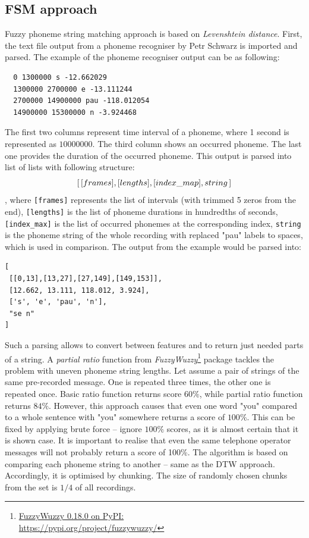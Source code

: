 \documentclass{ExcelAtFIT}
\begin{document}
\subsection{FSM approach}
Fuzzy phoneme string matching approach is based on \textit{Levenshtein distance}.
First, the text file output from a phoneme recogniser by Petr Schwarz \cite{SchwarzPhonerec} is imported and parsed. The example of the phoneme recogniser output can be as following: 
\begin{verbatim}
  0 1300000 s -12.662029
  1300000 2700000 e -13.111244
  2700000 14900000 pau -118.012054
  14900000 15300000 n -3.924468
\end{verbatim}
The first two columns represent time interval of a phoneme, where 1 second is represented as $10000000$. The third column shows an occurred phoneme. The last one provides the duration of the occurred phoneme. This output is parsed into list of lists with following structure: \texttt{\[[\,[frames],\-[lengths],\-[index\_map],\-string\,]\]}, where \texttt{[frames]} represents the list of intervals (with trimmed 5 zeros from the end), \texttt{[lengths]} is the list of phoneme durations in hundredths of seconds, \texttt{[index\_max]} is the list of occurred phonemes at the corresponding index, \texttt{string} is the phoneme string of the whole recording with replaced "pau" labels to spaces, which is used in comparison.
The output from the example would be parsed into:
\begin{verbatim}
[ 
 [[0,13],[13,27],[27,149],[149,153]],
 [12.662, 13.111, 118.012, 3.924],
 ['s', 'e', 'pau', 'n'],
 "se n"
]
\end{verbatim}
Such a parsing allows to convert between features and to return just needed parts of a string.
A \textit{partial ratio} function from \textit{FuzzyWuzzy}\footnote{\href{https://pypi.org/project/fuzzywuzzy/}{FuzzyWuzzy 0.18.0 on PyPI:\\https://pypi.org/project/fuzzywuzzy/}} package tackles the problem with uneven phoneme string lengths. Let assume a pair of strings of the same pre-recorded message. One is repeated three times, the other one is repeated once. Basic ratio function returns score $60\%$, while partial ratio function returns $84\%$. However, this approach causes that even one word "you" compared to a whole sentence with "you" somewhere returns a score of $100\%$. This can be fixed by applying brute force – ignore $100\%$ scores, as it is almost certain that it is shown case. It is important to realise that even the same telephone operator messages will not probably return a score of 100\%. The algorithm is based on comparing each phoneme string to another -- same as the DTW approach. Accordingly, it is optimised by chunking. The size of randomly chosen chunks from the set is $1/4$ of all recordings. 
\end{document}
